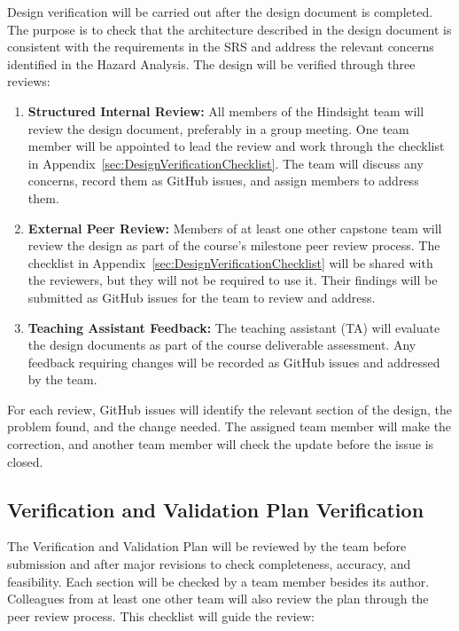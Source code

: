 \documentclass[10pt,titlepage]{article}
\begin{document}
Design verification will be carried out after the design document
is completed. The purpose is to check that the architecture described in
the design document is consistent with
the requirements in the SRS and address the relevant concerns identified
in the Hazard Analysis. The design will be verified through three reviews:

\begin{enumerate}
    \item \textbf{Structured Internal Review:} All members of the Hindsight team
    will review the design document, preferably in a group meeting. One team member
    will be appointed to lead the review and work through the checklist in
    Appendix~\ref{sec:DesignVerificationChecklist}. The team will discuss any
    concerns, record them as GitHub issues, and assign members to address them.

    \item \textbf{External Peer Review:} Members of at least one other capstone
    team will review the design as part of the course's milestone peer review
    process. The checklist in Appendix~\ref{sec:DesignVerificationChecklist}
    will be shared with the reviewers, but they will not be required to use it.
    Their findings will be submitted as GitHub issues for the team to review
    and address.

    \item \textbf{Teaching Assistant Feedback:} The teaching assistant (TA)
    will evaluate the design documents as part of the course deliverable
    assessment. Any feedback requiring changes will be recorded as GitHub
    issues and addressed by the team.
\end{enumerate}

For each review, GitHub issues will identify the relevant section of the design,
the problem found, and the change needed. The assigned team member will make
the correction, and another team member will check the update before the issue
is closed.

\subsection{Verification and Validation Plan Verification}\label{sec:VnVPlanVerification}

The Verification and Validation Plan will be reviewed by the team before submission and after major
revisions to check completeness, accuracy, and feasibility. Each section
will be checked by a team member besides its author. Colleagues from at
least one other team will also review the plan through the peer review process.
This checklist will guide the review:
\end{document}
